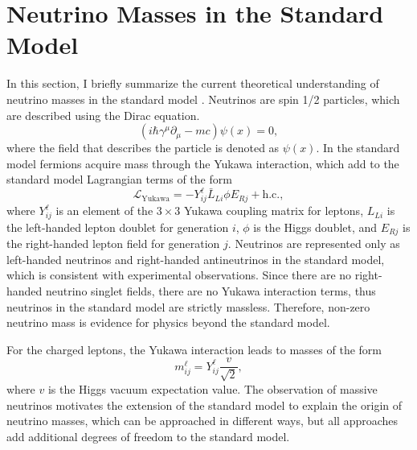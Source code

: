 \section{Neutrino Masses in the Standard Model}
\label{sec:chap2-nu-mass-sm}

In this section, I briefly summarize the current theoretical understanding of neutrino masses in the standard model \cite{nu_physics1, nu_physics2, nu_physics3}. Neutrinos are spin 1/2 particles, which are described using the Dirac equation. 
\begin{equation}
    (i\hbar\gamma^\mu\partial_\mu-mc)\psi(x)=0, 
\end{equation}
where the field that describes the particle is denoted as $\psi(x)$. In the standard model fermions acquire mass through the Yukawa interaction, which add to the standard model Lagrangian terms of the form 
\begin{equation}
    \mathcal{L}_\textrm{Yukawa}=-Y^\ell_{ij}\bar{L}_{Li}\phi E_{Rj}+\textrm{h.c.},
\end{equation}
where $Y_{ij}^\ell$ is an element of the $3\times3$ Yukawa coupling matrix for leptons, $L_{Li}$ is the left-handed lepton doublet for generation $i$, $\phi$ is the Higgs doublet, and $E_{Rj}$ is the right-handed lepton field for generation $j$. Neutrinos are represented only as left-handed neutrinos and right-handed antineutrinos in the standard model, which is consistent with experimental observations. Since there are no right-handed neutrino singlet fields, there are no Yukawa interaction terms, thus neutrinos in the standard model are strictly massless. Therefore, non-zero neutrino mass is evidence for physics beyond the standard model. 

For the charged leptons, the Yukawa interaction leads to masses of the form 
\begin{equation}
    m^\ell_{ij}=Y^\ell_{ij}\frac{v}{\sqrt{2}},
\end{equation}
where $v$ is the Higgs vacuum expectation value. The observation of massive neutrinos motivates the extension of the standard model to explain the origin of neutrino masses, which can be approached in different ways, but all approaches add additional degrees of freedom to the standard model. 

